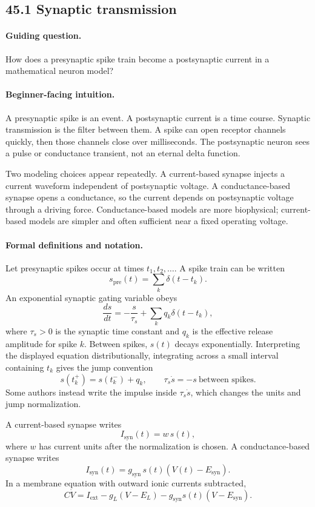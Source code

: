 \subsection{45.1 Synaptic transmission}

\paragraph{Guiding question.}
How does a presynaptic spike train become a postsynaptic current in a mathematical neuron model?

\paragraph{Beginner-facing intuition.}
A presynaptic spike is an event. A postsynaptic current is a time course. Synaptic transmission is the filter between them. A spike can open receptor channels quickly, then those channels close over milliseconds. The postsynaptic neuron sees a pulse or conductance transient, not an eternal delta function.

Two modeling choices appear repeatedly. A current-based synapse injects a current waveform independent of postsynaptic voltage. A conductance-based synapse opens a conductance, so the current depends on postsynaptic voltage through a driving force. Conductance-based models are more biophysical; current-based models are simpler and often sufficient near a fixed operating voltage.

\paragraph{Formal definitions and notation.}
Let presynaptic spikes occur at times \(t_1,t_2,\ldots\). A spike train can be written
\[
s_{\mathrm{pre}}(t)=\sum_k\delta(t-t_k).
\]
An exponential synaptic gating variable obeys
\[
\frac{ds}{dt}=-\frac{s}{\tau_s}+\sum_k q_k\delta(t-t_k),
\]
where \(\tau_s>0\) is the synaptic time constant and \(q_k\) is the effective release amplitude for spike \(k\). Between spikes, \(s(t)\) decays exponentially. Interpreting the displayed equation distributionally, integrating across a small interval containing \(t_k\) gives the jump convention
\[
s(t_k^+)=s(t_k^-)+q_k,\qquad
\tau_s\dot s=-s\ \text{between spikes}.
\]
Some authors instead write the impulse inside \(\tau_s\dot s\), which changes the units and jump normalization.

A current-based synapse writes
\[
I_{\mathrm{syn}}(t)=w\,s(t),
\]
where \(w\) has current units after the normalization is chosen. A conductance-based synapse writes
\[
\boxed{I_{\mathrm{syn}}(t)=g_{\mathrm{syn}}\,s(t)(V(t)-E_{\mathrm{syn}}).}
\]
In a membrane equation with outward ionic currents subtracted,
\[
C\dot V=I_{\mathrm{ext}}-g_L(V-E_L)-g_{\mathrm{syn}}s(t)(V-E_{\mathrm{syn}}).
\]

